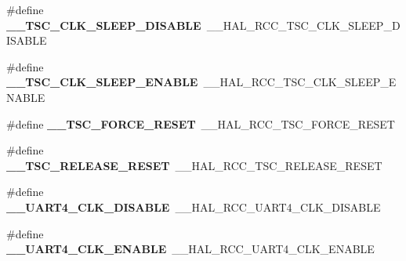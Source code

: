 \begin{DoxyCompactItemize}
\item 
\hypertarget{group___h_a_l___r_c_c___aliased_gaae6ea218d3a94e736dfac2c2386c8189}{\#define {\bfseries \-\_\-\-\_\-\-T\-S\-C\-\_\-\-C\-L\-K\-\_\-\-S\-L\-E\-E\-P\-\_\-\-D\-I\-S\-A\-B\-L\-E}~\-\_\-\-\_\-\-H\-A\-L\-\_\-\-R\-C\-C\-\_\-\-T\-S\-C\-\_\-\-C\-L\-K\-\_\-\-S\-L\-E\-E\-P\-\_\-\-D\-I\-S\-A\-B\-L\-E}\label{group___h_a_l___r_c_c___aliased_gaae6ea218d3a94e736dfac2c2386c8189}

\item 
\hypertarget{group___h_a_l___r_c_c___aliased_ga7b5f8a9297ad0b44ae5a8f138b3ec36e}{\#define {\bfseries \-\_\-\-\_\-\-T\-S\-C\-\_\-\-C\-L\-K\-\_\-\-S\-L\-E\-E\-P\-\_\-\-E\-N\-A\-B\-L\-E}~\-\_\-\-\_\-\-H\-A\-L\-\_\-\-R\-C\-C\-\_\-\-T\-S\-C\-\_\-\-C\-L\-K\-\_\-\-S\-L\-E\-E\-P\-\_\-\-E\-N\-A\-B\-L\-E}\label{group___h_a_l___r_c_c___aliased_ga7b5f8a9297ad0b44ae5a8f138b3ec36e}

\item 
\hypertarget{group___h_a_l___r_c_c___aliased_gacce146f2929b942c64a8e5aec1f21e3c}{\#define {\bfseries \-\_\-\-\_\-\-T\-S\-C\-\_\-\-F\-O\-R\-C\-E\-\_\-\-R\-E\-S\-E\-T}~\-\_\-\-\_\-\-H\-A\-L\-\_\-\-R\-C\-C\-\_\-\-T\-S\-C\-\_\-\-F\-O\-R\-C\-E\-\_\-\-R\-E\-S\-E\-T}\label{group___h_a_l___r_c_c___aliased_gacce146f2929b942c64a8e5aec1f21e3c}

\item 
\hypertarget{group___h_a_l___r_c_c___aliased_ga43df0cf8789c4ad5c6b75de0238cbb5b}{\#define {\bfseries \-\_\-\-\_\-\-T\-S\-C\-\_\-\-R\-E\-L\-E\-A\-S\-E\-\_\-\-R\-E\-S\-E\-T}~\-\_\-\-\_\-\-H\-A\-L\-\_\-\-R\-C\-C\-\_\-\-T\-S\-C\-\_\-\-R\-E\-L\-E\-A\-S\-E\-\_\-\-R\-E\-S\-E\-T}\label{group___h_a_l___r_c_c___aliased_ga43df0cf8789c4ad5c6b75de0238cbb5b}

\item 
\hypertarget{group___h_a_l___r_c_c___aliased_ga9cafabe9be45837925e0381029311698}{\#define {\bfseries \-\_\-\-\_\-\-U\-A\-R\-T4\-\_\-\-C\-L\-K\-\_\-\-D\-I\-S\-A\-B\-L\-E}~\-\_\-\-\_\-\-H\-A\-L\-\_\-\-R\-C\-C\-\_\-\-U\-A\-R\-T4\-\_\-\-C\-L\-K\-\_\-\-D\-I\-S\-A\-B\-L\-E}\label{group___h_a_l___r_c_c___aliased_ga9cafabe9be45837925e0381029311698}

\item 
\hypertarget{group___h_a_l___r_c_c___aliased_gaa7d235e31461e6946366a789a12d2a58}{\#define {\bfseries \-\_\-\-\_\-\-U\-A\-R\-T4\-\_\-\-C\-L\-K\-\_\-\-E\-N\-A\-B\-L\-E}~\-\_\-\-\_\-\-H\-A\-L\-\_\-\-R\-C\-C\-\_\-\-U\-A\-R\-T4\-\_\-\-C\-L\-K\-\_\-\-E\-N\-A\-B\-L\-E}\label{group___h_a_l___r_c_c___aliased_gaa7d235e31461e6946366a789a12d2a58}


\end{DoxyCompactItemize}
